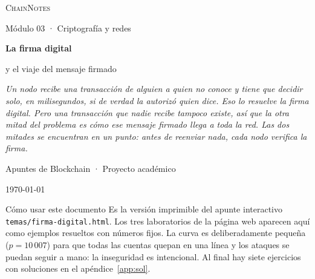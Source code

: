 \documentclass[11pt,a4paper]{article}
\theoremstyle{definition}
\theoremstyle{plain}
\theoremstyle{remark}
\begin{document}
\makeatletter
\DeclareRobustCommand{\%}{\char`\%\relax}
\makeatother

\begin{titlepage}
\centering
\vspace*{2.5cm}

{\Large\color{violetdeep}\textsc{ChainNotes}\par}
{\small\color{inkc}Módulo 03 · Criptografía y redes\par}

\vspace{1.4cm}
{\Huge\bfseries La firma digital\par}
\vspace{0.4cm}
{\LARGE y el viaje del mensaje firmado\par}

\vspace{1.2cm}
\begin{minipage}{0.78\textwidth}
\centering\itshape\color{inkc}
Un nodo recibe una transacción de alguien a quien no conoce y tiene que decidir
solo, en milisegundos, si de verdad la autorizó quien dice. Eso lo resuelve la
firma digital. Pero una transacción que nadie recibe tampoco existe, así que la
otra mitad del problema es cómo ese mensaje firmado llega a toda la red. Las dos
mitades se encuentran en un punto: antes de reenviar nada, cada nodo verifica la
firma.
\end{minipage}

\vspace{1.6cm}

\vfill
{\small Apuntes de Blockchain · Proyecto académico\par}
{\small\color{inkc}\today\par}
\end{titlepage}

\tableofcontents
\clearpage

\begin{nota}{Cómo usar este documento}
Es la versión imprimible del apunte interactivo \texttt{temas/firma-digital.html}.
Los tres laboratorios de la página web aparecen aquí como ejemplos resueltos con
números fijos. La curva es deliberadamente pequeña ($p = 10\,007$) para que todas
las cuentas quepan en una línea y los ataques se puedan seguir a mano: la
inseguridad es intencional. Al final hay siete ejercicios con soluciones en el
apéndice~\ref{app:sol}.
\end{nota}
\end{document}
